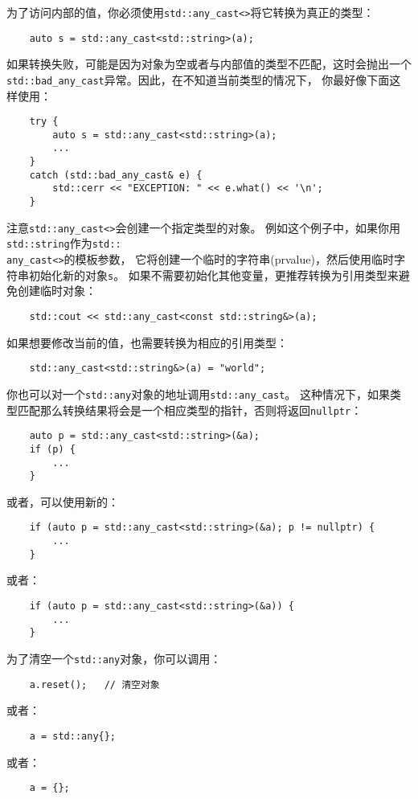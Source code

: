 为了访问内部的值，你必须使用\texttt{std::any\_cast<>}将它转换为真正的类型：
\begin{lstlisting}
    auto s = std::any_cast<std::string>(a);
\end{lstlisting}
如果转换失败，可能是因为对象为空或者与内部值的类型不匹配，这时会抛出一个
\texttt{std::bad\_any\_cast}异常。因此，在不知道当前类型的情况下，
你最好像下面这样使用：
\begin{lstlisting}
    try {
        auto s = std::any_cast<std::string>(a);
        ...
    }
    catch (std::bad_any_cast& e) {
        std::cerr << "EXCEPTION: " << e.what() << '\n';
    }
\end{lstlisting}
注意\texttt{std::any\_cast<>}会创建一个指定类型的对象。
例如这个例子中，如果你用\texttt{std::string}作为\texttt{std::\\
any\_cast<>}的模板参数，
它将创建一个临时的字符串(prvalue)，然后使用临时字符串初始化新的对象\texttt{s}。
如果不需要初始化其他变量，更推荐转换为引用类型来避免创建临时对象：
\begin{lstlisting}
    std::cout << std::any_cast<const std::string&>(a);
\end{lstlisting}
如果想要修改当前的值，也需要转换为相应的引用类型：
\begin{lstlisting}
    std::any_cast<std::string&>(a) = "world";
\end{lstlisting}
你也可以对一个\texttt{std::any}对象的地址调用\texttt{std::any\_cast}。
这种情况下，如果类型匹配那么转换结果将会是一个相应类型的指针，否则将返回\texttt{nullptr}：
\begin{lstlisting}
    auto p = std::any_cast<std::string>(&a);
    if (p) {
        ...
    }
\end{lstlisting}
或者，可以使用新的：
\begin{lstlisting}
    if (auto p = std::any_cast<std::string>(&a); p != nullptr) {
        ...
    }
\end{lstlisting}
或者：
\begin{lstlisting}
    if (auto p = std::any_cast<std::string>(&a)) {
        ...
    }
\end{lstlisting}
为了清空一个\texttt{std::any}对象，你可以调用：
\begin{lstlisting}
    a.reset();   // 清空对象
\end{lstlisting}
或者：
\begin{lstlisting}
    a = std::any{};
\end{lstlisting}
或者：
\begin{lstlisting}
    a = {};
\end{lstlisting}
